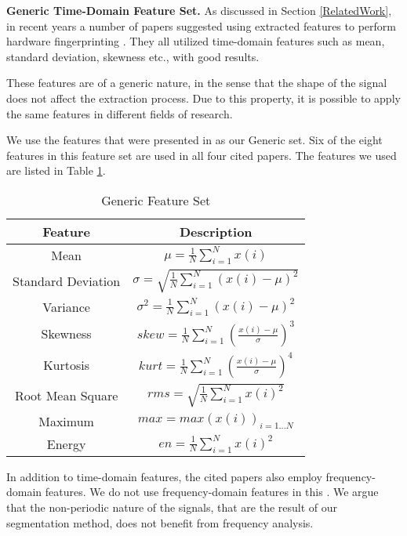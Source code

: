 \documentclass[compsoc,conference,a4paper]{IEEEtran}
\begin{document}
{\bf Generic Time-Domain Feature Set.}
  As discussed in Section \ref{RelatedWork}, in recent years a number of papers suggested using extracted features to perform hardware fingerprinting \cite{dey2014accelprint, choi2018identifying, choi2018voltageids, kneib2018scission}. They all utilized time-domain features such as mean, standard deviation, skewness etc., with good results.
  
  These features are of a generic nature, in the sense that the shape of the signal does not affect the extraction process. Due to this property, it is possible to apply the same features in different fields of research.
  
  We use the features that were presented in \cite{kneib2018scission} as our Generic set. Six of the eight features in this feature set are used in all four cited papers. The features we used are listed in Table \ref{tab:generic_feature_set}.
  
  \begin{table}
    \caption{Generic Feature Set}
    \label{tab:generic_feature_set}
    \centering
    \begin{tabular}{|c c|} 
      \hline
      Feature & Description \\ [0.5ex] 
      \hline\hline
      Mean & \(\mu = \frac{1}{N}\sum_{i=1}^{N}x(i)\) \\
      \hline
      Standard Deviation & \(\sigma = \sqrt{\frac{1}{N}\sum_{i=1}^{N}(x(i)-\mu)^2}\) \\
      \hline
      Variance & \(\sigma^2 = \frac{1}{N}\sum_{i=1}^{N}(x(i)-\mu)^2\) \\
      \hline
      Skewness & \(skew = \frac{1}{N} \sum_{i=1}^{N}(\frac{x(i)-\mu}{\sigma})^3\) \\
      \hline
      Kurtosis & \(kurt = \frac{1}{N} \sum_{i=1}^{N}(\frac{x(i)-\mu}{\sigma})^4\) \\
      \hline
      Root Mean Square & \(rms = \sqrt{\frac{1}{N}\sum_{i=1}^{N}x(i)^2}\) \\
      \hline
      Maximum & \(max = max(x(i))_{i=1...N}\) \\
      \hline
      Energy & \(en = \frac{1}{N}\sum_{i=1}^{N}x(i)^2\) \\
      \hline
    \end{tabular}
  \end{table}
  
  In addition to time-domain features, the cited papers also employ frequency-domain features. We do not use frequency-domain features in this \iftoggle{paper} {paper} {work}. We argue that the non-periodic nature of the signals, that are the result of our segmentation method, does not benefit from frequency analysis.
\end{document}

